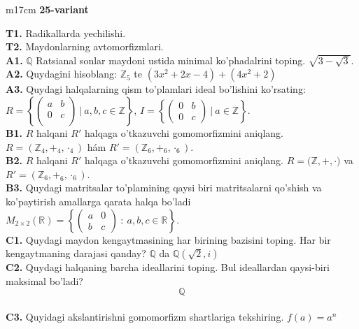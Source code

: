 \documentclass{article}
\begin{document}
\begin{tabular}{m{17cm}}
\textbf{25-variant}
\newline

\textbf{T1.} Radikallarda yechilishi. \\
\textbf{T2.} Maydonlarning avtomorfizmlari. \\
\textbf{A1.} \(\mathbb{Q}\) Ratsianal sonlar maydoni ustida minimal ko'phadalrini toping.
\(\sqrt{3 - \sqrt{3}}\). \\
\textbf{A2.} Quydagini hisoblang:
\(\mathbb{Z}_{5}\) te \(\left( 3x^{2} + 2x - 4 \right) + \left( 4x^{2} + 2 \right)\) \\
\textbf{A3.} Quydagi halqalarning qism to'plamlari ideal bo'lishini ko'rsating: \(R = \left\{ \begin{pmatrix}
a & b \\
0 & c \\
 & 
\end{pmatrix}\ |\ a,b,c \in \mathbb{Z} \right\}\), \(I = \left\{ \begin{pmatrix}
0 & b \\
0 & c
\end{pmatrix}\ |\ a \in \mathbb{Z} \right\}\). \\
\textbf{B1.} \(R\) halqani \(R'\) halqaga o'tkazuvchi gomomorfizmini aniqlang.
\(R = (\mathbb{Z}_{4}, +_{4}, \cdot_{4})\) hám \(R' = (\mathbb{Z}_{6}, +_{6}, \cdot_{6})\). \\
\textbf{B2.} \(R\) halqani \(R'\) halqaga o'tkazuvchi gomomorfizmini aniqlang.
\(R\mathbb{= (Z,} + , \cdot )\) va \(R' = (\mathbb{Z}_{6}, +_{6}, \cdot_{6})\). \\
\textbf{B3.} Quydagi matritsalar to'plamining qaysi biri matritsalarni qo'shish va ko'paytirish amallarga qarata halqa bo'ladi
\(M_{2 \times 2}\mathbb{(R) =}\left\{ \begin{pmatrix}
a & 0 \\
b & c
\end{pmatrix}\ :\ a,b,c \in \mathbb{R} \right\}\). \\
\textbf{C1.} Quydagi maydon kengaytmasining har birining bazisini toping. Har bir kengaytmaning darajasi qanday?
\(\mathbb{Q}\) da \(\mathbb{Q}\left( \sqrt{2},i \right)\) \\
\textbf{C2.} Quydagi halqaning barcha ideallarini toping. Bul ideallardan qaysi-biri maksimal bo'ladi?
\[\mathbb{Q}\] \\
\textbf{C3.} Quyidagi akslantirishni gomomorfizm shartlariga tekshiring. \(f(a) = a^{n}\) \\

\end{tabular}
\vspace{1cm}
\end{document}
